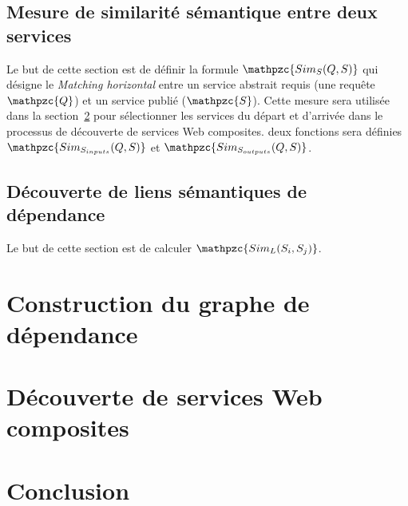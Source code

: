 
\subsection{Mesure de similarité sémantique entre deux services}
\label{sec:matching-sims}

Le but de cette section est de définir la formule {\large
  $\mathpzc{Sim_S(Q,S)}$} qui désigne le \emph{Matching horizontal}
entre un service abstrait requis (une requête $\mathpzc{Q}$) et un
service publié ($\mathpzc{S}$). Cette mesure sera utilisée dans la
section~\ref{sec:ch3/composition} pour sélectionner les services du
départ et d'arrivée dans le processus de découverte de services Web
composites. deux fonctions sera définies {\large
  $\mathpzc{Sim_{S_{inputs}}(Q,S)}$} et {\large
  $\mathpzc{Sim_{S_{outputs}}(Q,S)}$}.


\subsection{Découverte de liens sémantiques de dépendance}
\label{sec:matching-siml}

Le but de cette section est de calculer {\large
  $\mathpzc{Sim_L(S_i, S_j)}$}.

\section{Construction du graphe de dépendance}
\label{sec:ch3/graph}

\section{Découverte de services Web composites}
\label{sec:ch3/composition}

\section*{Conclusion}
\label{sec:ch3/conclusion}
 


